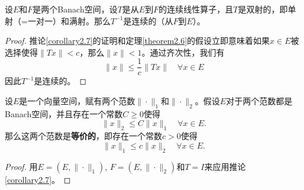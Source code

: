 \begin{corollary}\label{corollary2.7}
设$E$和$F$是两个Banach空间，设$T$是从$E$到$F$的连续线性算子，且$T$是双射的，即单射（=一对一）和满射。那么$T^{-1}$是连续的（从$F$到$E$）。
\end{corollary}

\begin{proof}
推论\ref{corollary2.7}的证明和定理\ref{theorem2.6}的假设立即意味着如果$x \in E$被选择使得$\|Tx\|<c$，那么$\|x\|<1$。通过齐次性，我们有
\[
\|x\| \leq \frac{1}{c} \|Tx\| \quad \forall x \in E
\]
因此$T^{-1}$是连续的。
\end{proof}

\begin{corollary}\label{corollary2.8}
设$E$是一个向量空间，赋有两个范数$\|\cdot\|_1$和$\|\cdot\|_2$。假设$E$对于两个范数都是Banach空间，并且存在一个常数$C \geq 0$使得
\[
\|x\|_2 \leq C\|x\|_1 \quad \forall x \in E.
\]
那么这两个范数是\textbf{等价的}，即存在一个常数$c>0$使得
\[
\|x\|_1 \leq c\|x\|_2 \quad \forall x \in E.
\]
\end{corollary}

\begin{proof}
用$E=(E, \|\cdot\|_1)$, $F=(E, \|\cdot\|_2)$和$T=I$来应用推论\ref{corollary2.7}。
\end{proof}

